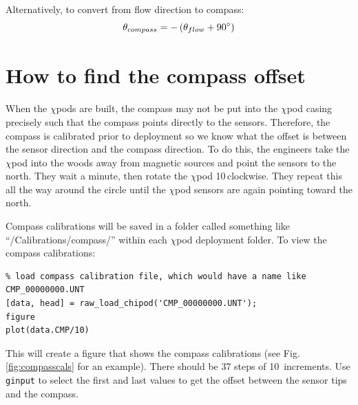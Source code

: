 \documentclass[12pt]{article}
\begin{document}
Alternatively, to convert from flow direction to compass:
\begin{equation}
\theta_{compass} = -\left(\theta_{flow} + 90\degree\right)
\end{equation}

\section{How to find the compass offset}
When the $\chi$pods are built, the compass may not be put into the $\chi$pod casing precisely such that the compass points directly to the sensors. Therefore, the compass is calibrated prior to deployment so we know what the offset is between the sensor direction and the compass direction. To do this, the engineers take the $\chi$pod into the woods away from magnetic sources and point the sensors to the north. They wait a minute, then rotate the $\chi$pod 10\degree \,clockwise. They repeat this all the way around the circle until the $\chi$pod sensors are again pointing toward the north.

Compass calibrations will be saved in a folder called something like ``/Calibrations/compass/'' within each $\chi$pod deployment folder. To view the compass calibrations:

\begin{verbatim}
% load compass calibration file, which would have a name like CMP_00000000.UNT
[data, head] = raw_load_chipod('CMP_00000000.UNT');   
figure
plot(data.CMP/10)    
\end{verbatim}

This will create a figure that shows the compass calibrations (see Fig. \ref{fig:compasscals} for an example). There should be 37 steps of 10\degree \, increments. Use \texttt{ginput} to select the first and last values to get the offset between the sensor tips and the compass.
\end{document}
